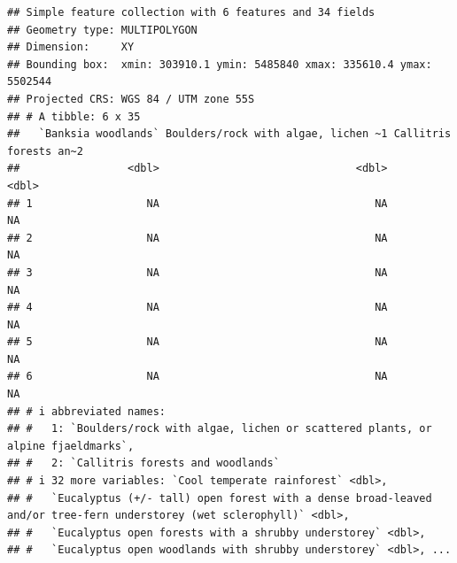 \documentclass[
  12pt,
]{book}
\newenvironment{Shaded}{\begin{snugshade}}{\end{snugshade}}
\newcommand{\CommentTok}[1]{\textcolor[rgb]{0.56,0.35,0.01}{\textit{#1}}}
\newcommand{\ConstantTok}[1]{\textcolor[rgb]{0.00,0.00,0.00}{#1}}
\newcommand{\ControlFlowTok}[1]{\textcolor[rgb]{0.13,0.29,0.53}{\textbf{#1}}}
\newcommand{\DecValTok}[1]{\textcolor[rgb]{0.00,0.00,0.81}{#1}}
\newcommand{\DocumentationTok}[1]{\textcolor[rgb]{0.56,0.35,0.01}{\textbf{\textit{#1}}}}
\newcommand{\FloatTok}[1]{\textcolor[rgb]{0.00,0.00,0.81}{#1}}
\newcommand{\FunctionTok}[1]{\textcolor[rgb]{0.00,0.00,0.00}{#1}}
\newcommand{\NormalTok}[1]{#1}
\newcommand{\OtherTok}[1]{\textcolor[rgb]{0.56,0.35,0.01}{#1}}
\newcommand{\SpecialCharTok}[1]{\textcolor[rgb]{0.00,0.00,0.00}{#1}}
\newcommand{\StringTok}[1]{\textcolor[rgb]{0.31,0.60,0.02}{#1}}
\begin{document}
\begin{Shaded}
\end{Shaded}

\begin{verbatim}
## Simple feature collection with 6 features and 34 fields
## Geometry type: MULTIPOLYGON
## Dimension:     XY
## Bounding box:  xmin: 303910.1 ymin: 5485840 xmax: 335610.4 ymax: 5502544
## Projected CRS: WGS 84 / UTM zone 55S
## # A tibble: 6 x 35
##   `Banksia woodlands` Boulders/rock with algae, lichen ~1 Callitris forests an~2
##                 <dbl>                               <dbl>                  <dbl>
## 1                  NA                                  NA                     NA
## 2                  NA                                  NA                     NA
## 3                  NA                                  NA                     NA
## 4                  NA                                  NA                     NA
## 5                  NA                                  NA                     NA
## 6                  NA                                  NA                     NA
## # i abbreviated names:
## #   1: `Boulders/rock with algae, lichen or scattered plants, or alpine fjaeldmarks`,
## #   2: `Callitris forests and woodlands`
## # i 32 more variables: `Cool temperate rainforest` <dbl>,
## #   `Eucalyptus (+/- tall) open forest with a dense broad-leaved and/or tree-fern understorey (wet sclerophyll)` <dbl>,
## #   `Eucalyptus open forests with a shrubby understorey` <dbl>,
## #   `Eucalyptus open woodlands with shrubby understorey` <dbl>, ...
\end{verbatim}
\end{document}
